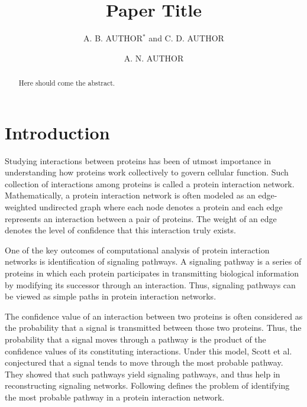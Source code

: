 \documentclass{ws-procs11x85}
\begin{document}
\title{Paper Title}

\author{A. B. AUTHOR$^*$ and C. D. AUTHOR}

\address{University Department, University Name,\\
City, State ZIP/Zone, Country\\
$^*$E-mail: ab\_author@university.com\\
www.university\_name.edu}

\author{A. N. AUTHOR}
 
\address{Group, Laboratory, Street,\\
City, State ZIP/Zone, Country\\
E-mail: an\_author@laboratory.com}

\begin{abstract}
Here should come the abstract.
\end{abstract}


\bodymatter

\section{Introduction} 
\label{introduction}

Studying interactions between proteins has been of utmost importance in
understanding how proteins work collectively to govern cellular
function\cite{schwikowski,uetz}. Such collection of interactions among
proteins is called a protein interaction network. Mathematically, a protein
interaction network is often modeled as an edge-weighted undirected graph where
each node denotes a protein and each edge represents an interaction between a
pair of proteins. The weight of an edge denotes the level of confidence that
this interaction truly exists.

One of the key outcomes of computational analysis of protein interaction
networks is identification of signaling pathways. A signaling pathway is a
series of proteins in which each protein participates in transmitting
biological information by modifying its successor through an
interaction. Thus, signaling pathways can be viewed as simple paths in protein
interaction networks\cite{kelley}.

The confidence value of an interaction between two proteins is often considered
as the probability that a signal is transmitted between those two proteins.
Thus, the probability that a signal moves through a pathway is the product of
the confidence values of its constituting interactions. Under this model, Scott
et al. conjectured that a signal tends to move through the most probable
pathway\cite{scott}. They showed that such pathways yield signaling pathways,
and thus help in reconstructing signaling networks. Following defines the
problem of identifying the most probable pathway in a protein interaction
network.
\end{document}
